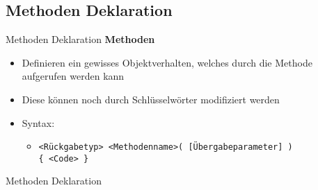 \subsection{Methoden Deklaration}
\begin{frame}{Methoden Deklaration}
	\textbf{Methoden}\\
	\begin{itemize}
		\item Definieren ein gewisses Objektverhalten, welches durch die Methode aufgerufen werden kann
		\item Diese können noch durch Schlüsselwörter modifiziert werden
		\item Syntax:
		\begin{itemize}			
			\item \texttt{\alert{<Rückgabetyp> <Methodenname>}( \alert{[Übergabeparameter]} ) \\ \{ \alert{<Code>} \}}
		\end{itemize}
	\end{itemize}		
\end{frame}

\begin{frame}{Methoden Deklaration}
	
		
\end{frame}



